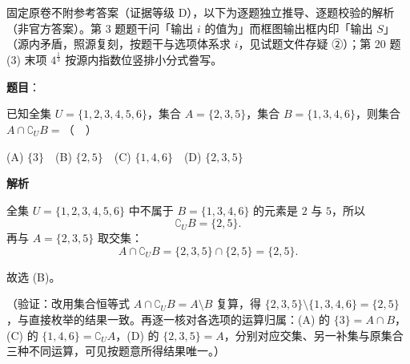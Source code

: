 
\begin{gktip}
固定原卷不附参考答案（证据等级 D），以下为逐题独立推导、逐题校验的解析（非官方答案）。第 3 题题干问「输出 \(i\) 的值为」而框图输出框内印「输出 \(S\)」（源内矛盾，照源复刻，按题干与选项体系求 \(i\)，见试题文件存疑 ②）；第 20 题 (3) 末项 \(4^{\frac{1}{3}}\) 按源内指数位竖排小分式誊写。
\end{gktip}

\begin{answer}

\textbf{题目}：

已知全集 \(U=\{1,2,3,4,5,6\}\)，集合 \(A=\{2,3,5\}\)，集合 \(B=\{1,3,4,6\}\)，则集合 \(A\cap\complement_U B=\)（　）

(A) \(\{3\}\)　(B) \(\{2,5\}\)　(C) \(\{1,4,6\}\)　(D) \(\{2,3,5\}\)

\textbf{解析}

全集 \(U=\{1,2,3,4,5,6\}\) 中不属于 \(B=\{1,3,4,6\}\) 的元素是 \(2\) 与 \(5\)，所以
\nopagebreak[4]
\[
\complement_U B=\{2,5\}.
\]
再与 \(A=\{2,3,5\}\) 取交集：
\nopagebreak[4]
\[
A\cap \complement_U B=\{2,3,5\}\cap\{2,5\}=\{2,5\}.
\]

故选 (B)。

（验证：改用集合恒等式 \(A\cap \complement_U B=A\setminus B\) 复算，得 \(\{2,3,5\}\setminus\{1,3,4,6\}=\{2,5\}\)，与直接枚举的结果一致。再逐一核对各选项的运算归属：(A) 的 \(\{3\}=A\cap B\)，(C) 的 \(\{1,4,6\}=\complement_U A\)，(D) 的 \(\{2,3,5\}=A\)，分别对应交集、另一补集与原集合三种不同运算，可见按题意所得结果唯一。）


\end{answer}
